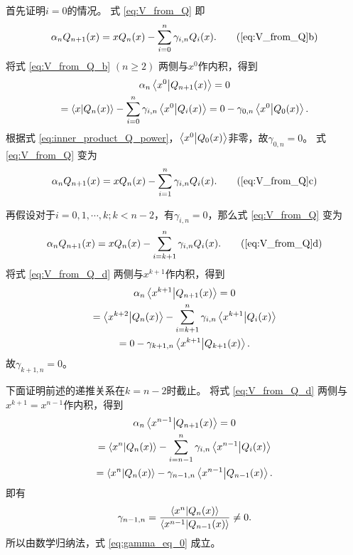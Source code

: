 \documentclass[a4paper,unicode]{report}
\begin{document}
首先证明$i = 0$的情况。
式 \eqref{eq:V_from_Q} 即
\begin{equation}\label{eq:V_from_Q_b}
    \alpha_n Q_{n+1}(x) = xQ_n(x) - \sum_{i=0}^n \gamma_{i,n} Q_i(x). \tag{\ref{eq:V_from_Q}b}
\end{equation}
将式 \eqref{eq:V_from_Q_b} $(n \ge 2)$ 两侧与$x^0$作内积，得到
\begin{multline}
    \alpha_n \braket{x^0}{Q_{n+1}(x)} = 0 \\
    = \braket{x}{Q_n(x)} - \sum_{i=0}^n \gamma_{i,n} \braket{x^0}{Q_i(x)} = 0 - \gamma_{0,n} \braket{x^0}{Q_0(x)}.
\end{multline}
根据式 \eqref{eq:inner_product_Q_power}，$\braket{x^0}{Q_0(x)}$非零，故$\gamma_{0,n}=0$。
式 \eqref{eq:V_from_Q} 变为
\begin{equation}\label{eq:V_from_Q_c}
    \alpha_n Q_{n+1}(x) = xQ_n(x) - \sum_{i=1}^n \gamma_{i,n} Q_i(x). \tag{\ref{eq:V_from_Q}c}
\end{equation}

再假设对于$i=0,1,\cdots,k; k<n-2 $，有$\gamma_{i, n} = 0$，那么式 \eqref{eq:V_from_Q} 变为
\begin{equation}\label{eq:V_from_Q_d}
    \alpha_n Q_{n+1}(x) = xQ_n(x) - \sum_{i=k+1}^n \gamma_{i,n} Q_i(x). \tag{\ref{eq:V_from_Q}d}
\end{equation}
将式 \eqref{eq:V_from_Q_d} 两侧与$x^{k+1}$作内积，得到
\begin{multline}
    \alpha_n \braket{x^{k+1}}{Q_{n+1}(x)} = 0 \\
    = \braket{x^{k+2}}{Q_n(x)} - \sum_{i=k+1}^n \gamma_{i,n} \braket{x^{k+1}}{Q_i(x)} \\
    = 0 - \gamma_{k+1,n} \braket{x^{k+1}}{Q_{k+1}(x)}.
\end{multline}
故$\gamma_{k+1,n}=0$。

下面证明前述的递推关系在$k = n-2$时截止。
将式 \eqref{eq:V_from_Q_d} 两侧与$x^{k+1} = x^{n-1}$作内积，得到
\begin{multline}
    \alpha_n \braket{x^{n-1}}{Q_{n+1}(x)} = 0 \\
    = \braket{x^{n}}{Q_n(x)} - \sum_{i=n-1}^n \gamma_{i,n} \braket{x^{n-1}}{Q_i(x)} \\
    = \braket{x^{n}}{Q_n(x)} - \gamma_{n-1,n} \braket{x^{n-1}}{Q_{n-1}(x)}.
\end{multline}
即有
\begin{equation}
    \gamma_{n-1,n} = \frac{\braket{x^{n}}{Q_n(x)}}{\braket{x^{n-1}}{Q_{n-1}(x)}} \neq 0.
\end{equation}
所以由数学归纳法，式 \eqref{eq:gamma_eq_0} 成立。
\end{document}
